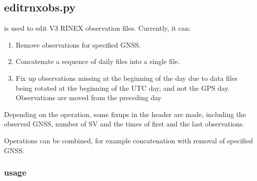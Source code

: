 \subsection{editrnxobs.py}

\hypertarget{h:editrnxobs}{}

 is used to edit V3 RINEX observation files. 
Currently, it can:
\begin{enumerate}
\item Remove observations for specified GNSS.
\item Concatenate a sequence of daily files into a single file. 
\item Fix up observations missing at the beginning of the day due to  data files being rotated at the beginning of the UTC day, and not the GPS day. Observations are moved from the preceding day
\end{enumerate}

Depending on the operation, some fixups in the header are made, including the observed GNSS, number of SV and
the times of first and the last observations.

Operations can be combined, for example concatenation with removal of specified GNSS.


\subsubsection{usage}

